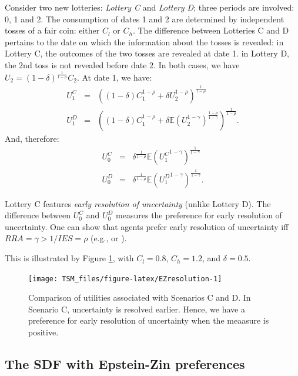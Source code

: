 \documentclass[
  12pt,
]{book}
\theoremstyle{definition}
\theoremstyle{definition}
\theoremstyle{definition}
\theoremstyle{definition}
\theoremstyle{remark}
\begin{document}
Consider two new lotteries: \emph{Lottery C} and \emph{Lottery D}; three periods are involved: 0, 1 and 2. The consumption of dates 1 and 2 are determined by independent tosses of a fair coin: either \(C_l\) or \(C_h\). The difference between Lotteries C and D pertains to the date on which the information about the tosses is revealed: in Lottery C, the outcomes of the two tosses are revealed at date 1. in Lottery D, the \(2\)nd toss is not revealed before date \(2\).
In both cases, we have \(U_2 = (1-\delta)^{\frac{1}{1-\rho}}C_{2}\).
At date 1, we have:
\begin{eqnarray*}
U_1^C &=& \left((1-\delta)C_1^{1-\rho} + \delta U_2^{1-\rho}\right)^{\frac{1}{1-\rho}}\\
U_1^D &=& \left((1-\delta)C_1^{1-\rho} + \delta \mathbb{E}(U_2^{1-\gamma})^{\frac{1-\rho}{1-\gamma}}\right)^{\frac{1}{1-\rho}}.
\end{eqnarray*}
And, therefore:
\begin{eqnarray*}
U_0^C &=& \delta^{\frac{1}{1-\rho}} \mathbb{E}({U_1^C}^{1-\gamma})^{\frac{1}{1-\gamma}}\\
U_0^D &=& \delta^{\frac{1}{1-\rho}} \mathbb{E}({U_1^D}^{1-\gamma})^{\frac{1}{1-\gamma}}.
\end{eqnarray*}

Lottery C features \emph{early resolution of uncertainty} (unlike Lottery D).
The difference between \(U_0^C\) and \(U_0^D\) measures the preference for early resolution of uncertainty.
One can show that agents prefer early resolution of uncertainty iff \(RRA = \gamma > 1/IES = \rho\) (e.g., \citet{Epstein_Fahri_Strzalecki_2014} or \citet{Duffie_Epstein_1992}).

This is illustrated by Figure \ref{fig:EZresolution}, with \(C_l = 0.8\), \(C_h = 1.2\), and \(\delta = 0.5\).

\begin{figure}
\texttt{[image: TSM\_files/figure-latex/EZresolution-1]} \caption{Comparison of utilities associated with Scenarios C and D. In Scenario C, uncertainty is resolved earlier. Hence, we have a preference for early resolution of uncertainty when the meaasure is positive.}\label{fig:EZresolution}
\end{figure}

\hypertarget{the-sdf-with-epstein-zin-preferences}{%
\subsection{The SDF with Epstein-Zin preferences}\label{the-sdf-with-epstein-zin-preferences}}
\end{document}
